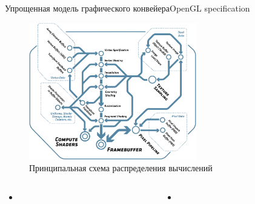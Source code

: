 \documentclass{beamer}
\begin{document}
\begin{frame}{Упрощенная модель графического конвейера}{OpenGL specification}
	\begin{figure} 
		\includegraphics[width=0.65\textwidth]{images/OpenGL_specification_graphics_pipeline.png}
		\caption {Принципальная схема распределения вычислений}
	\end{figure}
\end{frame}


\begin{frame}{}{}
	
\end{frame}

\begin{columns}
	
	\begin{column}{0.5\textwidth}
		\begin{itemize}
			\item
			
		\end{itemize}
	\end{column}
	\begin{column}{0.5\textwidth}
		\begin{itemize}
			\item
		\end{itemize}
	\end{column}
	
\end{columns}
\fi
	
\end{document}
